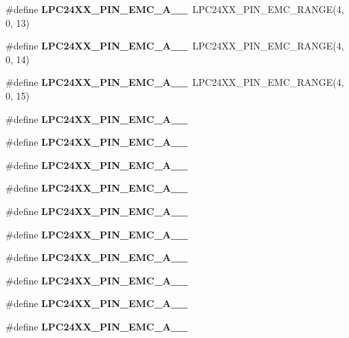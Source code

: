 \begin{DoxyCompactItemize}
\#define {\bfseries L\+P\+C24\+X\+X\+\_\+\+P\+I\+N\+\_\+\+E\+M\+C\+\_\+\+A\+\_\+\_}~L\+P\+C24\+X\+X\+\_\+\+P\+I\+N\+\_\+\+E\+M\+C\+\_\+\+R\+A\+N\+GE(4, 0, 13)
\item 
\mbox{\label{group__lpc24xx__io_gaedea9e787b553a55e5ac2ea9bf7df918}} 
\#define {\bfseries L\+P\+C24\+X\+X\+\_\+\+P\+I\+N\+\_\+\+E\+M\+C\+\_\+\+A\+\_\+\_}~L\+P\+C24\+X\+X\+\_\+\+P\+I\+N\+\_\+\+E\+M\+C\+\_\+\+R\+A\+N\+GE(4, 0, 14)
\item 
\mbox{\label{group__lpc24xx__io_ga0f355264bf448e2b8f21a82cb69ed29e}} 
\#define {\bfseries L\+P\+C24\+X\+X\+\_\+\+P\+I\+N\+\_\+\+E\+M\+C\+\_\+\+A\+\_\+\_}~L\+P\+C24\+X\+X\+\_\+\+P\+I\+N\+\_\+\+E\+M\+C\+\_\+\+R\+A\+N\+GE(4, 0, 15)
\item 
\#define {\bfseries L\+P\+C24\+X\+X\+\_\+\+P\+I\+N\+\_\+\+E\+M\+C\+\_\+\+A\+\_\+\_}
\item 
\#define {\bfseries L\+P\+C24\+X\+X\+\_\+\+P\+I\+N\+\_\+\+E\+M\+C\+\_\+\+A\+\_\+\_}
\item 
\#define {\bfseries L\+P\+C24\+X\+X\+\_\+\+P\+I\+N\+\_\+\+E\+M\+C\+\_\+\+A\+\_\+\_}
\item 
\#define {\bfseries L\+P\+C24\+X\+X\+\_\+\+P\+I\+N\+\_\+\+E\+M\+C\+\_\+\+A\+\_\+\_}
\item 
\#define {\bfseries L\+P\+C24\+X\+X\+\_\+\+P\+I\+N\+\_\+\+E\+M\+C\+\_\+\+A\+\_\+\_}
\item 
\#define {\bfseries L\+P\+C24\+X\+X\+\_\+\+P\+I\+N\+\_\+\+E\+M\+C\+\_\+\+A\+\_\+\_}
\item 
\#define {\bfseries L\+P\+C24\+X\+X\+\_\+\+P\+I\+N\+\_\+\+E\+M\+C\+\_\+\+A\+\_\+\_}
\item 
\#define {\bfseries L\+P\+C24\+X\+X\+\_\+\+P\+I\+N\+\_\+\+E\+M\+C\+\_\+\+A\+\_\+\_}
\item 
\#define {\bfseries L\+P\+C24\+X\+X\+\_\+\+P\+I\+N\+\_\+\+E\+M\+C\+\_\+\+A\+\_\+\_}
\item 
\#define {\bfseries L\+P\+C24\+X\+X\+\_\+\+P\+I\+N\+\_\+\+E\+M\+C\+\_\+\+A\+\_\+\_}
\end{DoxyCompactItemize}
